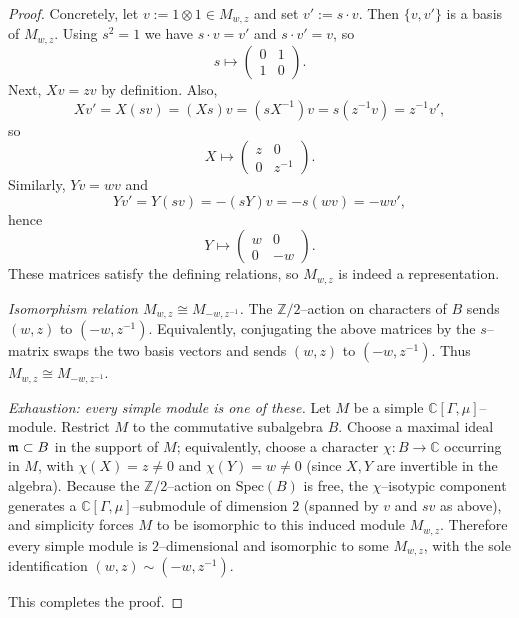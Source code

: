 \documentclass[10pt,a4paper]{amsart}
\newcommand{\C}{\mathbb{C}}
\def\Spec{\mathrm{Spec}}
\newcommand{\Z}{\mathbb{Z}}
\begin{document}
\begin{proof}
Concretely, let $v:=1\otimes 1\in M_{w,z}$ and set $v':=s\cdot v$.
Then $\{v,v'\}$ is a basis of $M_{w,z}$.
Using $s^2=1$ we have $s\cdot v=v'$ and $s\cdot v'=v$, so
\[
s\mapsto \begin{pmatrix}0&1\\[2pt]1&0\end{pmatrix}.
\]
Next, $Xv=zv$ by definition.
Also,
\[
Xv' = X(sv) = (Xs)v = (sX^{-1})v = s(z^{-1}v)=z^{-1}v',
\]
so
\[
X\mapsto \begin{pmatrix} z&0\\[2pt]0&z^{-1}\end{pmatrix}.
\]
Similarly, $Yv=wv$ and
\[
Yv' = Y(sv) = -(sY)v = -s(wv)= -wv',
\]
hence
\[
Y\mapsto \begin{pmatrix} w&0\\[2pt]0&-w\end{pmatrix}.
\]
These matrices satisfy the defining relations, so $M_{w,z}$ is indeed a representation.

\medskip
\emph{Isomorphism relation $M_{w,z}\cong M_{-w,z^{-1}}$.}
The $\Z/2$--action on characters of $B$ sends $(w,z)$ to $(-w,z^{-1})$.
Equivalently, conjugating the above matrices by the $s$--matrix swaps the two basis vectors
and sends $(w,z)$ to $(-w,z^{-1})$.
Thus $M_{w,z}\cong M_{-w,z^{-1}}$.

\medskip
\emph{Exhaustion: every simple module is one of these.}
Let $M$ be a simple $\C[\Gamma,\mu]$--module.
Restrict $M$ to the commutative subalgebra $B$.
Choose a maximal ideal $\frak m\subset B$ in the support of $M$; equivalently,
choose a character $\chi:B\to\C$ occurring in $M$, with $\chi(X)=z\neq 0$ and $\chi(Y)=w\neq 0$
(since $X,Y$ are invertible in the algebra).
Because the $\Z/2$--action on $\Spec(B)$ is free, the $\chi$--isotypic component generates a
$\C[\Gamma,\mu]$--submodule of dimension $2$ (spanned by $v$ and $sv$ as above), and simplicity
forces $M$ to be isomorphic to this induced module $M_{w,z}$.
Therefore every simple module is $2$--dimensional and isomorphic to some $M_{w,z}$, with the
sole identification $(w,z)\sim(-w,z^{-1})$.

This completes the proof.
\end{proof}
\end{document}
